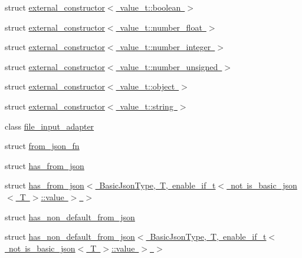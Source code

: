 \begin{DoxyCompactItemize}
struct \mbox{\hyperlink{structnlohmann_1_1detail_1_1external__constructor_3_01value__t_1_1boolean_01_4}{external\+\_\+constructor$<$ value\+\_\+t\+::boolean $>$}}
\item 
struct \mbox{\hyperlink{structnlohmann_1_1detail_1_1external__constructor_3_01value__t_1_1number__float_01_4}{external\+\_\+constructor$<$ value\+\_\+t\+::number\+\_\+float $>$}}
\item 
struct \mbox{\hyperlink{structnlohmann_1_1detail_1_1external__constructor_3_01value__t_1_1number__integer_01_4}{external\+\_\+constructor$<$ value\+\_\+t\+::number\+\_\+integer $>$}}
\item 
struct \mbox{\hyperlink{structnlohmann_1_1detail_1_1external__constructor_3_01value__t_1_1number__unsigned_01_4}{external\+\_\+constructor$<$ value\+\_\+t\+::number\+\_\+unsigned $>$}}
\item 
struct \mbox{\hyperlink{structnlohmann_1_1detail_1_1external__constructor_3_01value__t_1_1object_01_4}{external\+\_\+constructor$<$ value\+\_\+t\+::object $>$}}
\item 
struct \mbox{\hyperlink{structnlohmann_1_1detail_1_1external__constructor_3_01value__t_1_1string_01_4}{external\+\_\+constructor$<$ value\+\_\+t\+::string $>$}}
\item 
class \mbox{\hyperlink{classnlohmann_1_1detail_1_1file__input__adapter}{file\+\_\+input\+\_\+adapter}}
\item 
struct \mbox{\hyperlink{structnlohmann_1_1detail_1_1from__json__fn}{from\+\_\+json\+\_\+fn}}
\item 
struct \mbox{\hyperlink{structnlohmann_1_1detail_1_1has__from__json}{has\+\_\+from\+\_\+json}}
\item 
struct \mbox{\hyperlink{structnlohmann_1_1detail_1_1has__from__json_3_01BasicJsonType_00_01T_00_01enable__if__t_3_01not_5e786a91cad76ed1c14f425887b41640}{has\+\_\+from\+\_\+json$<$ Basic\+Json\+Type, T, enable\+\_\+if\+\_\+t$<$ not is\+\_\+basic\+\_\+json$<$ T $>$\+::value $>$ $>$}}
\item 
struct \mbox{\hyperlink{structnlohmann_1_1detail_1_1has__non__default__from__json}{has\+\_\+non\+\_\+default\+\_\+from\+\_\+json}}
\item 
struct \mbox{\hyperlink{structnlohmann_1_1detail_1_1has__non__default__from__json_3_01BasicJsonType_00_01T_00_01enable__a9e4562f31f7ed523e6e0f675606b0f2}{has\+\_\+non\+\_\+default\+\_\+from\+\_\+json$<$ Basic\+Json\+Type, T, enable\+\_\+if\+\_\+t$<$ not is\+\_\+basic\+\_\+json$<$ T $>$\+::value $>$ $>$}}
\item 

\end{DoxyCompactItemize}
